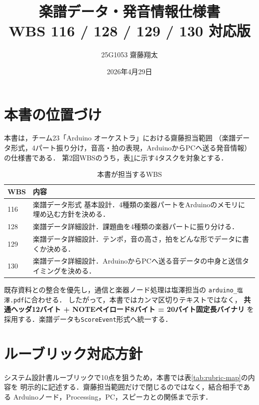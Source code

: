 \documentclass[uplatex,dvipdfmx]{jlreq}
\newcommand{\code}[1]{\texttt{#1}}
\begin{document}
\title{楽譜データ・発音情報仕様書\\
{\large WBS 116 / 128 / 129 / 130 対応版}}
\author{25G1053 齋藤翔太}
\date{2026年4月29日}
\maketitle

\section*{本書の位置づけ}

本書は，チーム23「Arduino オーケストラ」における齋藤担当範囲
（楽譜データ形式，4パート振り分け，音高・拍の表現，ArduinoからPCへ送る発音情報）
の仕様書である．
第2回WBSのうち，表\ref{tab:wbs-scope}に示す4タスクを対象とする．

\begin{table}[h]
\centering
\caption{本書が担当するWBS}
\label{tab:wbs-scope}
\begin{tabular}{p{}p{}}
\toprule
\textbf{WBS} & \textbf{内容} \\
\midrule
116 & 楽譜データ形式 基本設計．4種類の楽器パートをArduinoのメモリに埋め込む方針を決める．\\
128 & 楽譜データ詳細設計．課題曲を4種類の楽器パートに振り分ける．\\
129 & 楽譜データ詳細設計．テンポ，音の高さ，拍をどんな形でデータに書くか決める．\\
130 & 楽譜データ詳細設計．ArduinoからPCへ送る音データの中身と送信タイミングを決める．\\
\bottomrule
\end{tabular}
\end{table}

既存資料との整合を優先し，通信と楽器ノード処理は塩澤担当の
\code{arduino\_塩澤.pdf}に合わせる．
したがって，本書ではカンマ区切りテキストではなく，
\textbf{共通ヘッダ12バイト + NOTEペイロード8バイト = 20バイト固定長バイナリ}
を採用する．楽譜データも\code{ScoreEvent}形式へ統一する．

\section{ルーブリック対応方針}

システム設計書ルーブリックで10点を狙うため，本書では表\ref{tab:rubric-map}の内容を
明示的に記述する．齋藤担当範囲だけで閉じるのではなく，結合相手である
Arduinoノード，Processing，PC，スピーカとの関係まで示す．
\end{document}
